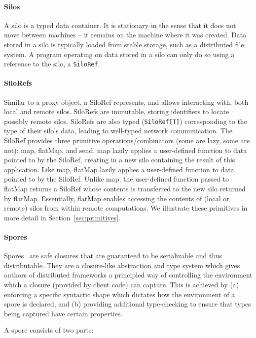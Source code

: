 \documentclass[preprint]{sigplanconf}
\theoremstyle{definition}
\theoremstyle{definition}
\begin{document}
\paragraph{Silos}
A silo is a typed data container. It is stationary in the sense that it does
not move between machines -- it remains on the machine where it was created.
Data stored in a silo is typically loaded from stable storage, such as a
distributed file system. A program operating on data stored in a silo can only
do so using a reference to the silo, a \verb|SiloRef|.

\paragraph{SiloRefs}
Similar to a proxy object, a SiloRef represents, and allows interacting with,
both local and remote silos. SiloRefs are immutable, storing identifiers to
locate possibly remote silos. SiloRefs are also typed (\verb|SiloRef[T]|)
corresponding to the type of their silo's data, leading to well-typed network
communication. The SiloRef provides three primitive operations/combinators
(some are lazy, some are not): map, flatMap, and send. map lazily applies a
user-defined function to data pointed to by the SiloRef, creating in a new
silo containing the result of this application. Like map, flatMap lazily
applies a user-defined function to data pointed to by the SiloRef. Unlike map,
the user-defined function passed to flatMap returns a SiloRef whose contents
is transferred to the new silo returned by flatMap. Essentially, flatMap
enables accessing the contents of (local or remote) silos from within remote
computations. We illustrate these primitives in more detail in Section~\ref{sec:primitives}.

\paragraph{Spores}

Spores~\cite{Spores} are safe closures that are guaranteed to be serializable
and thus distributable. They are a closure-like abstraction and type system
which gives authors of distributed frameworks a principled way of controlling
the environment which a closure (provided by client code) can capture. This is
achieved by (a) enforcing a specific syntactic shape which dictates how the
environment of a spore is declared, and (b) providing additional type-checking
to ensure that types being captured have certain properties.

\vspace{3mm}
\noindent A spore consists of two parts:
\end{document}
